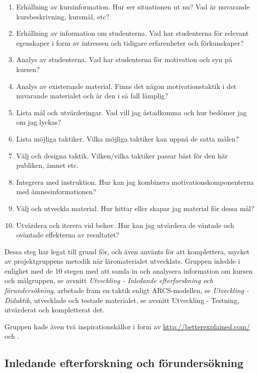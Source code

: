 \documentclass[]{article}
\begin{document}
\begin{enumerate}
  \item Erhållning av kursinformation. Hur ser situationen ut nu? Vad är nuvarande kursbeskrivning, kursmål, etc?
  \item Erhållning av information om studenterna. Vad har studenterna för relevant egenskaper i form av intressen och
  tidigare erfarenheter och förkunskaper?
  \item Analys av studenterna. Vad har studenterna för motivation och syn på kursen?
  \item Analys av existerande material. Finns det någon motivationstaktik i det nuvarande materialet och är den i så
  fall lämplig?
  \item Lista mål och utvärderingar. Vad vill jag åstadkomma och hur bedömer jag om jag lyckas?
  \item Lista möjliga taktiker. Vilka möjliga taktiker kan uppnå de satta målen?
  \item Välj och designa taktik. Vilken/vilka taktiker passar bäst för den här publiken, ämnet etc.
  \item Integrera med instruktion. Hur kan jag kombinera motivationskomponenterna med ämnesinformationen?
  \item Välj och utveckla material. Hur hittar eller skapar jag material för dessa mål?
  \item Utvärdera och iterera vid behov. Hur kan jag utvärdera de väntade och oväntade effekterna av resultatet?
\end{enumerate}


Dessa steg har legat till grund för, och även använts för att komplettera, mycket av projektgruppens metodik när
läromaterialet utvecklats. Gruppen inledde i enlighet med de 10 stegen med att samla in och analysera information om
kursen och målgruppen, se avsnitt \textit{Utveckling - Inledande efterforskning och förundersökning}, arbetade fram en taktik
enligt ARCS-modellen, se \textit{Utveckling - Didaktik}, utvecklade och testade materialet, se avsnitt
{Utveckling - Testning}, utvärderat och kompletterat det.

Gruppen hade även två inspirationskällor i form av \url{http://betterexplained.com/} och \cite{learnyouahaskell}.


\subsection{Inledande efterforskning och förundersökning}
\end{document}
